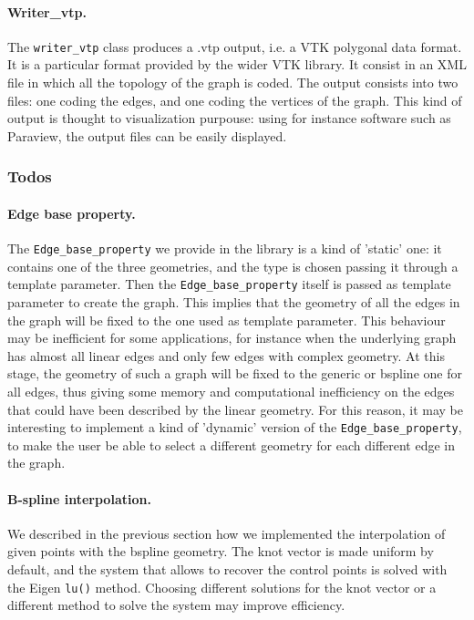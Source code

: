 \documentclass[10pt]{article} %
\newcommand{\classname}[1]{\texttt{#1}}
\begin{document}
	\paragraph{Writer\_vtp.} The \texttt{writer\_vtp} class produces a .vtp output, i.e. a VTK polygonal data format. It is a particular format provided by the wider VTK library. It consist in an XML file in which all the topology of the graph is coded. The output consists into two files: one coding the edges, and one coding the vertices of the graph. This kind of output is thought to visualization purpouse: using for instance software such as Paraview, the output files can be easily displayed.
	
	\subsubsection{Todos}
	\paragraph{Edge base property.} The \classname{Edge\_base\_property} we provide in the library is a kind of 'static' one: it contains one of the three geometries, and the type is chosen passing it through a template parameter. Then the \classname{Edge\_base\_property} itself is passed as template parameter to create the graph. This implies that the geometry of all the edges in the graph will be fixed to the one used as template parameter. This behaviour may be inefficient for some applications, for instance when the underlying graph has almost all linear edges and only few edges with complex geometry. At this stage, the geometry of such a graph will be fixed to the generic or bspline one for all edges, thus giving some memory and computational inefficiency on the edges that could have been described by the linear geometry. For this reason, it may be interesting to implement a kind of 'dynamic' version of the \classname{Edge\_base\_property}, to make the user be able to select a different geometry for each different edge in the graph.
	\paragraph{B-spline interpolation.} We described in the previous section how we implemented the interpolation of given points with the bspline geometry. The knot vector is made uniform by default, and the system that allows to recover the control points is solved with the Eigen \texttt{lu()} method. Choosing different solutions for the knot vector or a different method to solve the system may improve efficiency.
	
\end{document}
